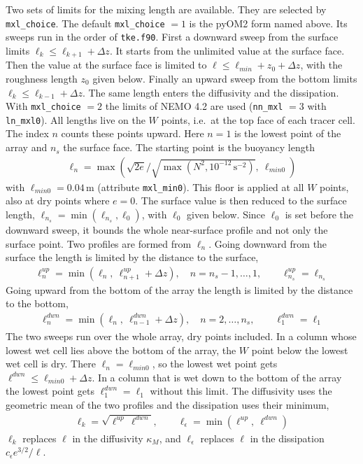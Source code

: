 \documentclass[12pt]{article}
\newcommand{\beeq}  { \begin{eqnarray*} }
\newcommand{\eeeq}  { \end{eqnarray*}}
\newcommand{\lk}{\left(}
\newcommand{\rk}{\right)}
\begin{document}
Two sets of limits for the mixing length are available. They are selected by \verb|mxl_choice|.
The default \verb|mxl_choice| $=1$ is the pyOM2 form named above.
Its sweeps run in the order of \verb|tke.f90|.
First a downward sweep from the surface limits $\ell_k \le \ell_{k+1} + \Delta z$.
It starts from the unlimited value at the surface face.
Then the value at the surface face is limited to $\ell \le \ell_{min} + z_0 + \Delta z$,
with the roughness length $z_0$ given below.
Finally an upward sweep from the bottom limits $\ell_k \le \ell_{k-1} + \Delta z$.
The same length enters the diffusivity and the dissipation.
With \verb|mxl_choice| $=2$ the limits of NEMO 4.2 are used (\verb|nn_mxl| $=3$ with \verb|ln_mxl0|).
All lengths live on the $W$ points, i.e.\ at the top face of each tracer cell.
The index $n$ counts these points upward. Here $n=1$ is the lowest point of the array
and $n_s$ the surface face.
The starting point is the buoyancy length
\beeq
 \ell_n = \max \lk \sqrt{2 e} / \sqrt{\max(N^2, 10^{-12}\,\mbox{s}^{-2})},\ \ell_{min0} \rk
\eeeq
with $\ell_{min0} = 0.04\,$m (attribute \verb|mxl_min0|).
This floor is applied at all $W$ points, also at dry points where $e=0$.
The surface value is then reduced to the surface length, $\ell_{n_s} = \min(\ell_{n_s}, \ell_0)$, with $\ell_0$ given below.
Since $\ell_0$ is set before the downward sweep, it bounds the whole near-surface profile and not only the surface point.
Two profiles are formed from $\ell_n$. Going downward from the surface the length is limited by the distance to the surface,
\beeq
 \ell^{up}_n = \min \lk \ell_n,\ \ell^{up}_{n+1} + \Delta z \rk, \quad n = n_s-1, \ldots, 1, \qquad \ell^{up}_{n_s} = \ell_{n_s}
\eeeq
Going upward from the bottom of the array the length is limited by the distance to the bottom,
\beeq
 \ell^{dwn}_n = \min \lk \ell_n,\ \ell^{dwn}_{n-1} + \Delta z \rk, \quad n = 2, \ldots, n_s, \qquad \ell^{dwn}_1 = \ell_1
\eeeq
The two sweeps run over the whole array, dry points included.
In a column whose lowest wet cell lies above the bottom of the array, the $W$ point below the lowest wet cell is dry.
There $\ell_n = \ell_{min0}$, so the lowest wet point gets $\ell^{dwn} \le \ell_{min0} + \Delta z$.
In a column that is wet down to the bottom of the array the lowest point gets $\ell^{dwn}_1 = \ell_1$ without this limit.
The diffusivity uses the geometric mean of the two profiles and the dissipation uses their minimum,
\beeq
 \ell_k = \sqrt{\ell^{up}\, \ell^{dwn}} , \qquad \ell_\epsilon = \min \lk \ell^{up},\ \ell^{dwn} \rk
\eeeq
$\ell_k$ replaces $\ell$ in the diffusivity $\kappa_M$, and $\ell_\epsilon$ replaces $\ell$ in the dissipation $c_\epsilon e^{3/2}/\ell$.
\end{document}
